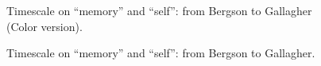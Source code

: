 \documentclass[a4paper,landscape]{scrartcl}
\begin{document}
\begin{figure}[htbp]
\centering

\caption{Timescale on ``memory'' and ``self'': from Bergson to Gallagher (Color version). }
\label{fig:bergson-color}
\end{figure}

\clearpage

\begin{figure}[htbp]
\centering

\caption{Timescale on ``memory'' and ``self'': from Bergson to Gallagher. }
\label{fig:bergson-gray}
\end{figure}
\end{document}
